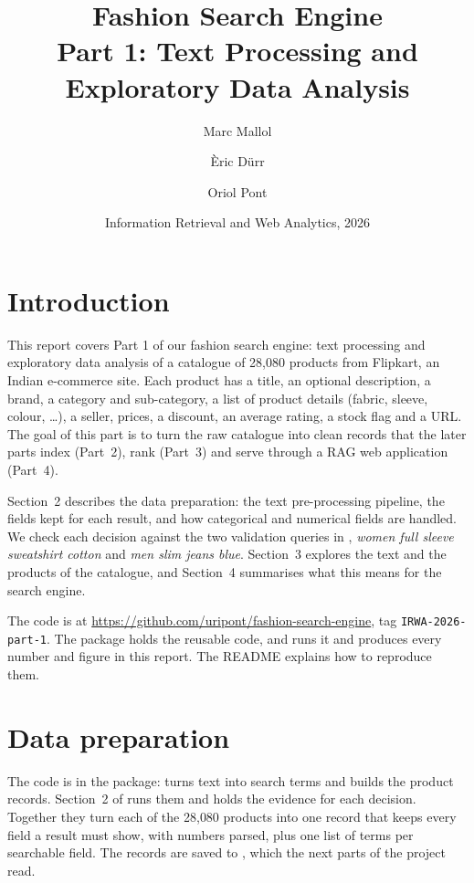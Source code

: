 \documentclass[11pt,a4paper]{article}
\title{Fashion Search Engine\\[0.3em]\large Part 1: Text Processing and Exploratory Data Analysis}
\author{Marc Mallol\and Èric Dürr\and Oriol Pont}
\date{Information Retrieval and Web Analytics, 2026}
\begin{document}
\maketitle

\section{Introduction}

This report covers Part 1 of our fashion search engine: text processing and
exploratory data analysis of a catalogue of 28{,}080 products from Flipkart, an
Indian e-commerce site. Each product has a title, an optional description, a
brand, a category and sub-category, a list of product details (fabric, sleeve,
colour, \ldots), a seller, prices, a discount, an average rating, a stock flag
and a URL. The goal of this part is to turn the raw catalogue into clean records
that the later parts index (Part~2), rank (Part~3) and serve through a RAG web
application (Part~4).

Section~2 describes the data preparation: the text pre-processing pipeline, the
fields kept for each result, and how categorical and numerical fields are
handled. We check each decision against the two validation queries in
, \emph{women full sleeve sweatshirt cotton} and
\emph{men slim jeans blue}. Section~3 explores the text and the products of the
catalogue, and Section~4 summarises what this means for the search engine.

The code is at \url{https://github.com/uripont/fashion-search-engine}, tag
\texttt{IRWA-2026-part-1}. The  package holds the reusable
code, and  runs it and produces every number and
figure in this report. The README explains how to reproduce them.

\section{Data preparation}

The code is in the  package:  turns text into
search terms and  builds the product records. Section~2 of
 runs them and holds the evidence for each decision.
Together they turn each of the 28{,}080 products into one record that keeps every
field a result must show, with numbers parsed, plus one list of terms per searchable
field. The records are saved to , which the
next parts of the project read.
\end{document}
